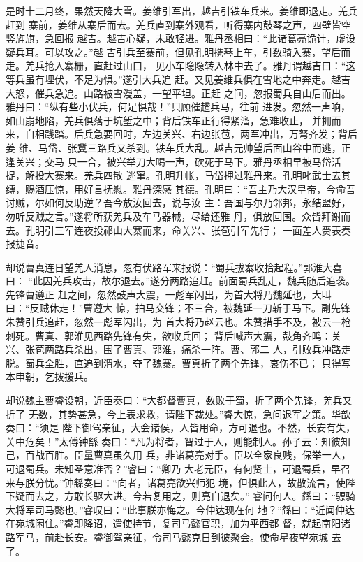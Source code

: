 是时十二月终，果然天降大雪。姜维引军出，越吉引铁车兵来。姜维即退走。羌兵赶到
寨前，姜维从寨后而去。羌兵直到寨外观看，听得寨内鼓琴之声，四壁皆空竖旌旗，急回报
越吉。越吉心疑，未敢轻进。雅丹丞相曰：“此诸葛亮诡计，虚设疑兵耳。可以攻之。”越
吉引兵至寨前，但见孔明携琴上车，引数骑入寨，望后而走。羌兵抢入寨栅，直赶过山口，
见小车隐隐转入林中去了。雅丹谓越吉曰：“这等兵虽有埋伏，不足为惧。”遂引大兵追
赶。又见姜维兵俱在雪地之中奔走。越吉大怒，催兵急追。山路被雪漫盖，一望平坦。正赶
之间，忽报蜀兵自山后而出。雅丹曰：“纵有些小伏兵，何足惧哉！”只顾催趱兵马，往前
进发。忽然一声响，如山崩地陷，羌兵俱落于坑堑之中；背后铁车正行得紧溜，急难收止，
并拥而来，自相践踏。后兵急要回时，左边关兴、右边张苞，两军冲出，万弩齐发；背后姜
维、马岱、张冀三路兵又杀到。铁车兵大乱。越吉元帅望后面山谷中而逃，正逢关兴；交马
只一合，被兴举刀大喝一声，砍死于马下。雅丹丞相早被马岱活捉，解投大寨来。羌兵四散
逃窜。孔明升帐，马岱押过雅丹来。孔明叱武士去其缚，赐酒压惊，用好言抚慰。雅丹深感
其德。孔明曰：“吾主乃大汉皇帝，今命吾讨贼，尔如何反助逆？吾今放汝回去，说与汝
主：吾国与尔乃邻邦，永结盟好，勿听反贼之言。”遂将所获羌兵及车马器械，尽给还雅
丹，俱放回国。众皆拜谢而去。孔明引三军连夜投祁山大寨而来，命关兴、张苞引军先行；
一面差人赍表奏报捷音。

却说曹真连日望羌人消息，忽有伏路军来报说：“蜀兵拔寨收拾起程。”郭淮大喜曰：
“此因羌兵攻击，故尔退去。”遂分两路追赶。前面蜀兵乱走，魏兵随后追袭。先锋曹遵正
赶之间，忽然鼓声大震，一彪军闪出，为首大将乃魏延也，大叫曰：“反贼休走！”曹遵大
惊，拍马交锋；不三合，被魏延一刀斩于马下。副先锋朱赞引兵追赶，忽然一彪军闪出，为
首大将乃赵云也。朱赞措手不及，被云一枪刺死。曹真、郭淮见西路先锋有失，欲收兵回；
背后喊声大震，鼓角齐鸣：关兴、张苞两路兵杀出，围了曹真、郭淮，痛杀一阵。曹、郭二
人，引败兵冲路走脱。蜀兵全胜，直追到渭水，夺了魏寨。曹真折了两个先锋，哀伤不已；
只得写本申朝，乞拨援兵。

却说魏主曹睿设朝，近臣奏曰：“大都督曹真，数败于蜀，折了两个先锋，羌兵又折了
无数，其势甚急，今上表求救，请陛下裁处。”睿大惊，急问退军之策。华歆奏曰：“须是
陛下御驾亲征，大会诸侯，人皆用命，方可退也。不然，长安有失，关中危矣！”太傅钟繇
奏曰：“凡为将者，智过于人，则能制人。孙子云：知彼知己，百战百胜。臣量曹真虽久用
兵，非诸葛亮对手。臣以全家良贱，保举一人，可退蜀兵。未知圣意准否？”睿曰：“卿乃
大老元臣，有何贤士，可退蜀兵，早召来与朕分忧。”钟繇奏曰：“向者，诸葛亮欲兴师犯
境，但惧此人，故散流言，使陛下疑而去之，方敢长驱大进。今若复用之，则亮自退矣。”
睿问何人。繇曰：“骠骑大将军司马懿也。”睿叹曰：“此事朕亦悔之。今仲达现在何
地？”繇曰：“近闻仲达在宛城闲住。”睿即降诏，遣使持节，复司马懿官职，加为平西都
督，就起南阳诸路军马，前赴长安。睿御驾亲征，令司马懿克日到彼聚会。使命星夜望宛城
去了。

